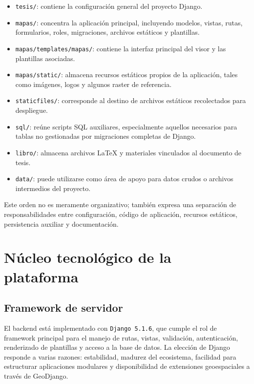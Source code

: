 \documentclass[12pt,a4paper]{report}
\begin{document}
\begin{itemize}
    \item \texttt{tesis/}: contiene la configuraci\'on general del proyecto Django.
    \item \texttt{mapas/}: concentra la aplicaci\'on principal, incluyendo modelos, vistas, rutas, formularios, roles, migraciones, archivos est\'aticos y plantillas.
    \item \texttt{mapas/templates/mapas/}: contiene la interfaz principal del visor y las plantillas asociadas.
    \item \texttt{mapas/static/}: almacena recursos est\'aticos propios de la aplicaci\'on, tales como im\'agenes, logos y algunos raster de referencia.
    \item \texttt{staticfiles/}: corresponde al destino de archivos est\'aticos recolectados para despliegue.
    \item \texttt{sql/}: re\'une scripts SQL auxiliares, especialmente aquellos necesarios para tablas no gestionadas por migraciones completas de Django.
    \item \texttt{libro/}: almacena archivos \LaTeX{} y materiales vinculados al documento de tesis.
    \item \texttt{data/}: puede utilizarse como \'area de apoyo para datos crudos o archivos intermedios del proyecto.
\end{itemize}

Este orden no es meramente organizativo; tambi\'en expresa una separaci\'on de responsabilidades entre configuraci\'on, c\'odigo de aplicaci\'on, recursos est\'aticos, persistencia auxiliar y documentaci\'on.

\section{N\'ucleo tecnol\'ogico de la plataforma}

\subsection{Framework de servidor}

El backend est\'a implementado con \texttt{Django 5.1.6}, que cumple el rol de framework principal para el manejo de rutas, vistas, validaci\'on, autenticaci\'on, renderizado de plantillas y acceso a la base de datos. La elecci\'on de Django responde a varias razones: estabilidad, madurez del ecosistema, facilidad para estructurar aplicaciones modulares y disponibilidad de extensiones geoespaciales a trav\'es de GeoDjango.
\end{document}
